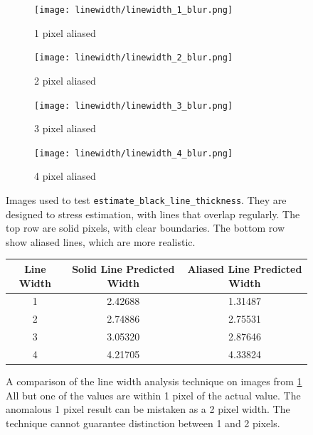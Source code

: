 \documentclass[../main.tex]{subfiles}
\begin{document}
\begin{figure}[H]
      \begin{subfigure}[B]{0.19\textwidth}
        \centering
        \texttt{[image: linewidth/linewidth\_1\_blur.png]}
        \caption{1 pixel aliased}
      \end{subfigure}
      \begin{subfigure}[B]{0.19\textwidth}
        \centering
        \texttt{[image: linewidth/linewidth\_2\_blur.png]}
        \caption{2 pixel aliased}
      \end{subfigure}
       \begin{subfigure}[B]{0.19\textwidth}
        \centering
        \texttt{[image: linewidth/linewidth\_3\_blur.png]}
        \caption{3 pixel aliased}
      \end{subfigure}
     \begin{subfigure}[B]{0.19\textwidth}
        \centering
        \texttt{[image: linewidth/linewidth\_4\_blur.png]}
        \caption{4 pixel aliased}
      \end{subfigure}
      \caption{
        Images used to test \texttt{estimate\_black\_line\_thickness}.
        They are designed to stress estimation, with lines that overlap regularly.
        The top row are solid pixels, with clear boundaries.
        The bottom row show aliased lines, which are more realistic.
      }
      \label{solid_linewidth}

    \end{figure}
    \begin{figure}[H]
      \centering
      \begin{tabular}{|c|c|c|}
        \hline
        Line Width&Solid Line Predicted Width&Aliased Line Predicted Width\\
        \hline
        1&2.42688&1.31487\\
        \hline
        2&2.74886&2.75531\\
        \hline
        3&3.05320&2.87646\\
        \hline
        4&4.21705&4.33824\\
        \hline
      \end{tabular}
      \caption{
        A comparison of the line width analysis technique on images from \ref{solid_linewidth}
        All but one of the values are within 1 pixel of the actual value.
        The anomalous 1 pixel result can be mistaken as a 2 pixel width.
        The technique cannot guarantee distinction between 1 and 2 pixels.
      }
      \label{linewidthtable}
  \end{figure}
\end{document}
